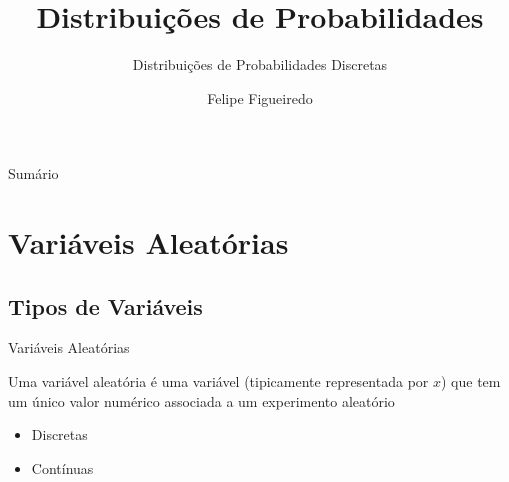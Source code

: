 \documentclass{beamer}
\title%
{Distribuições de Probabilidades}
\subtitle
{Distribuições de Probabilidades Discretas} %
\author%
{Felipe Figueiredo}%
\institute[UNIAN] %
{Centro Universitário Anhanguera de Niterói}
\date%
{}
\begin{document}
\begin{frame}
  \titlepage
\end{frame}

\begin{frame}{Sumário}
  \tableofcontents
\end{frame}







\section{Variáveis Aleatórias}

\subsection{Tipos de Variáveis}
\begin{frame}{Variáveis Aleatórias}
\begin{definition}
  Uma \alert{variável aleatória} é uma variável (tipicamente
  representada por $x$) que tem um único valor numérico associada a um
  experimento aleatório
\end{definition}
\begin{itemize}
\item Discretas%
\item Contínuas%
\end{itemize}
\end{frame}
\end{document}
